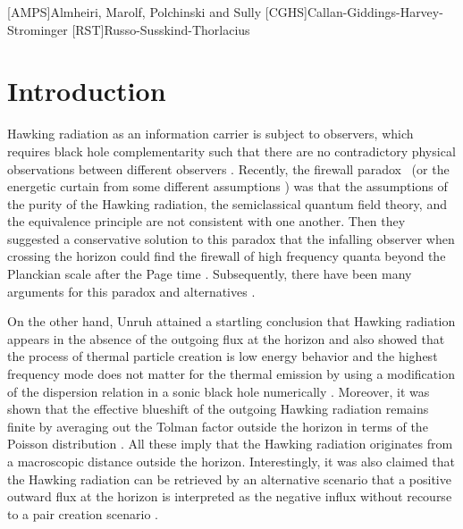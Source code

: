\documentclass[aps,preprint,a4paper,showpacs,showkeys,superscriptaddress]{revtex4-1}
\begin{document}

[AMPS]{Almheiri, Marolf, Polchinski and Sully}
[CGHS]{Callan-Giddings-Harvey-Strominger}
[RST]{Russo-Susskind-Thorlacius}

\section{Introduction}
\label{sec:intro}
Hawking radiation as an information carrier \cite{Hawking:1974sw} is subject to observers,
which requires black hole complementarity such that
there are no contradictory physical observations between different observers
\cite{Susskind:1993if}.
Recently, the firewall paradox~\cite{Almheiri:2012rt} (or
the energetic curtain from some different assumptions
\cite{Braunstein:2009my})
was that the assumptions of the purity of the Hawking radiation, the semiclassical quantum field theory,
and the equivalence principle are not consistent with one another.
Then they suggested a conservative solution to this paradox that the infalling observer when crossing the horizon
could find the firewall of high frequency quanta beyond the Planckian scale
after the Page time \cite{Page:1993wv}.
Subsequently, there have been many
arguments for this paradox and alternatives \cite{Bousso:2012as, Nomura:2012sw, Susskind:2012rm, Hossenfelder:2012mr, Giddings:2013kcj,
 Almheiri:2013hfa, Hutchinson:2013kka, Freivogel:2014dca}.

On the other hand, Unruh
attained a startling conclusion that Hawking radiation
appears in the absence of the outgoing flux at the horizon
\cite{Unruh:1976db} and also
showed that the process of thermal particle creation is low energy behavior
and the highest frequency mode does not matter for the thermal emission by
using a modification of the dispersion relation in a sonic black hole numerically \cite{Unruh:1994zw}.
Moreover, it was shown that the
effective blueshift of the outgoing Hawking radiation
remains finite
by averaging out the Tolman factor outside the horizon in terms of the Poisson distribution
\cite{Casadio:2002dj}.
All these imply that the Hawking radiation originates from a macroscopic distance
outside the horizon.
Interestingly, it was also claimed that the Hawking radiation can be retrieved by an alternative scenario
that a positive outward flux at the horizon is interpreted as the negative influx
without recourse to a pair creation scenario \cite{Israel:2015ava}.
\end{document}
